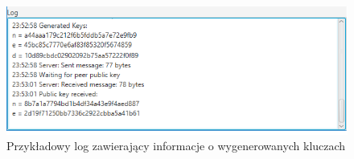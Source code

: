 \documentclass[10pt,a4paper]{article}
\begin{document}
\begin{figure}[!h]
	\centering
	\includegraphics[scale=0.85]{img/key_gen.png}
	\caption{Przykładowy log zawierający informacje o wygenerowanych kluczach}
	\label{fig:key_gen}
\end{figure}

	
\end{document}
